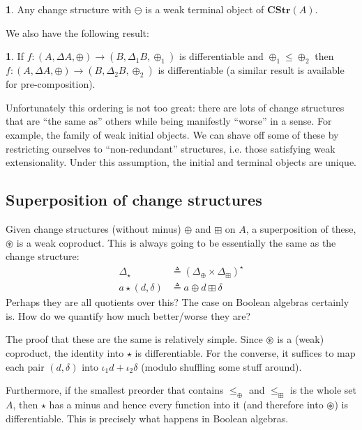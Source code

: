 \documentclass[english]{article}
\newcommand{\als}[1]{\begin{align*} #1 \end{align*}}
\newcommand{\A}[1]{\mathbf{#1}}
\theoremstyle{plain}
\theoremstyle{remark}
\theoremstyle{remark}
\theoremstyle{remark}
\theoremstyle{definition}
\theoremstyle{definition}
\newtheorem{prop}[thm]{\protect\propositionname}
\newcommand{\ra}[0]{\rightarrow}
\providecommand{\propositionname}{Proposition}
\begin{document}
\begin{prop}
  Any change structure with $\ominus$ is a weak terminal object of $\A{CStr}(A)$.
\end{prop}

We also have the following result:

\begin{prop}
  If $f : (A, \Delta A, \oplus) \ra (B, \Delta_1 B, \oplus_1)$ is differentiable and
  $\oplus_1 \leq \oplus_2$ then $f : (A, \Delta A, \oplus) \ra (B, \Delta_2 B, \oplus_2)$ is
  differentiable (a similar result is available for pre-composition).
\end{prop}

Unfortunately this ordering is not too great: there are lots of change structures that are
``the same as'' others while being manifestly ``worse'' in a sense. For example, the family of
weak initial objects. We can shave off some of these by restricting ourselves to ``non-redundant''
structures, i.e. those satisfying weak extensionality. Under this assumption, the initial
and terminal objects are unique.

\subsection{Superposition of change structures}

Given change structures (without minus) $\oplus$ and $\boxplus$ on $A$, a superposition of these,
$\circledast$ is a weak coproduct. This is always going to be essentially the same as the
change structure:
\als{
  \Delta_\star &\triangleq (\Delta_\oplus \times \Delta_\boxplus)^\star\\
  a \star (d, \delta) &\triangleq a \oplus d \boxplus \delta
}
Perhaps they are all quotients over this? The case on Boolean algebras certainly is. How do we
quantify how much better/worse they are?

\newcommand{\cast}[0]{\circledast}
The proof that these are the same is relatively simple. Since $\cast$ is a (weak) coproduct, the
identity into $\star$ is differentiable. For the converse, it suffices to map each pair
$(d, \delta)$ into $\iota_1 d + \iota_2 \delta$ (modulo shuffling some stuff around).

Furthermore, if the smallest preorder that contains $\leq_\oplus$ and $\leq_\boxplus$ is the whole
set $A$, then $\star$ has a minus and hence every function into it (and therefore into $\cast$)
is differentiable. This is precisely what happens in Boolean algebras.
\end{document}
